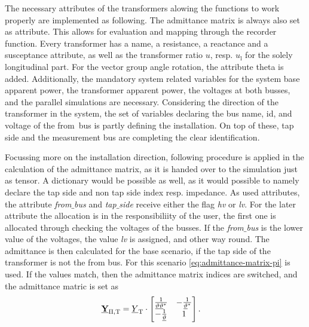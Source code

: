 The necessary attributes of the transformers alowing the functions to work properly are implemented as following.
The admittance matrix is always also set as attribute.
This allows for evaluation and mapping through the recorder function.
Every transformer has a name, a resistance, a reactance and a susceptance attribute, as well as the transformer ratio $u$, resp. $u_\mathrm{l}$ for the solely longitudinal part.
For the vector group angle rotation, the attribute theta is added.
Additionally, the mandatory system related variables for the system base apparent power, the transformer apparent power, the voltages at both busses, and the parallel simulations are necessary.
Considering the direction of the transformer in the system, the set of variables declaring the bus name, id, and voltage of the \glqq from\grqq~bus is partly defining the installation.
On top of these, tap side and the measurement bus are completing the clear identification.

Focussing more on the installation direction, following procedure is applied in the calculation of the admittance matrix, as it is handed over to the simulation just as tensor.
A dictionary would be possible as well, as it would possible to namely declare the tap side and non tap side index resp. impedance.
As used attributes, the attribute \textit{from$\_$bus} and \textit{tap$\_$side} receive either the flag \textit{hv} or \textit{lv}.
For the later attribute the allocation is in the responsibiliity of the user, the first one is allocated through checking the voltages of the busses.
If the \textit{from$\_$bus} is the lower value of the voltages, the value \textit{lv} is assigned, and other way round.
The admittance is then calculated for the base scenario, if the tap side of the transformer is not the from bus.
For this scenario \autoref{eq:admittance-matrix-pi} is used.
If the values match, then the admittance matrix indices are switched, and the admittance matric is set as
\begin{align}
        \underline{\mathrm{\textbf{Y}}}_\mathrm{\Pi,T}&=\underline{Y}_\mathrm{T} \cdot
        \begin{bmatrix}
                \frac{1}{\underline{\vartheta}\underline{\vartheta}^*} & -\frac{1}{\underline{\vartheta}^*} \\
                -\frac{1}{\underline{\vartheta}} & 1
        \end{bmatrix}. \notag
\end{align}

